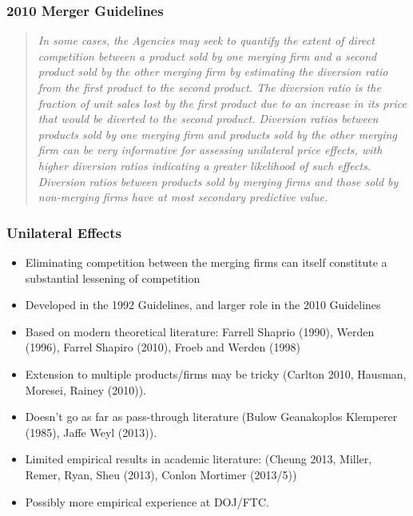 \documentclass[xcolor=pdftex,dvipsnames,table,mathserif]{beamer}
\begin{document}
\begin{frame}
\frametitle{2010 Merger Guidelines}
\begin{quotation}
\textit{
In some cases, the Agencies may seek to quantify the extent of direct competition between a product sold by one merging firm and a second product sold by the other merging firm by estimating the diversion ratio from the first product to the second product. \alert{The diversion ratio is the fraction of unit sales lost by the first product due to an increase in its price that would be diverted to the second product. }Diversion ratios between products sold by one merging firm and products sold by the other merging firm can be very informative for \alert{assessing unilateral price effects, with higher diversion ratios indicating a greater likelihood of such effects}. Diversion ratios between products sold by merging firms and those sold by non-merging firms have at most secondary predictive value.}
\end{quotation}
\end{frame}

\begin{frame}
\frametitle{Unilateral Effects}
\begin{itemize}
\item Eliminating competition between the merging firms can itself constitute a substantial lessening of competition
\item Developed in the 1992 Guidelines, and larger role in the 2010 Guidelines
\item Based on modern theoretical literature: Farrell Shaprio (1990), Werden (1996), Farrel Shapiro (2010), Froeb and Werden (1998)
\item Extension to multiple products/firms may be tricky (Carlton 2010, Hausman, Moresei, Rainey (2010)).
\item Doesn't go as far as pass-through literature (Bulow Geanakoplos Klemperer (1985), Jaffe Weyl (2013)). 
\item Limited empirical results in academic literature: (Cheung 2013, Miller, Remer, Ryan, Sheu (2013), Conlon Mortimer (2013/5))
\item Possibly more empirical experience at DOJ/FTC.
\end{itemize} 
\end{frame}
\end{document}
